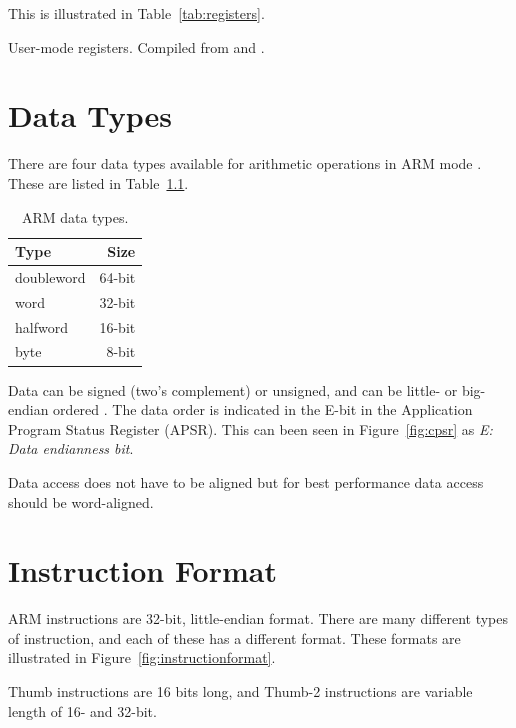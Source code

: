 \documentclass[oneside,a4paper]{report}
\begin{document}
This is illustrated in Table~\ref{tab:registers}.

\begin{table}[htbp]
	\centering
	\singlespacing
	
	\caption{User-mode registers. Compiled from \cite[p. 15]{AAPCS} and \cite[p. 14--15]{iOSABI}.}
	\label{tab:registers}
\end{table}

\chapter{Data Types}

There are four data types available for arithmetic operations in ARM mode \cite[p. 2-14]{A8Ref}. These are listed in Table~\ref{tab:datatypes}.

\begin{table}[htb]
	\centering
	\begin{tabular}{lr}
		\toprule
		Type			&		Size		\\
		\midrule
		doubleword		&		64-bit		\\
		word			& 		32-bit		\\
		halfword 		& 		16-bit		\\
		byte 			& 		8-bit		\\
		\bottomrule
	\end{tabular}
	\caption{ARM data types.}
	\label{tab:datatypes}
\end{table}

Data can be signed (two's complement) or unsigned, and can be little- or big-endian ordered \cite[p. 4-2]{A8Ref}. The data order is indicated in the E-bit in the Application Program Status Register (APSR). This can been seen in Figure~\ref{fig:cpsr} as \emph{E: Data endianness bit}.

Data access does not have to be aligned but for best performance data access should be word-aligned.

\chapter{Instruction Format}

ARM instructions are 32-bit, little-endian format. There are many different types of instruction, and each of these has a different format. These formats are illustrated in Figure~\ref{fig:instructionformat}.

Thumb instructions are 16 bits long, and Thumb-2 instructions are variable length of 16- and 32-bit.
\end{document}
